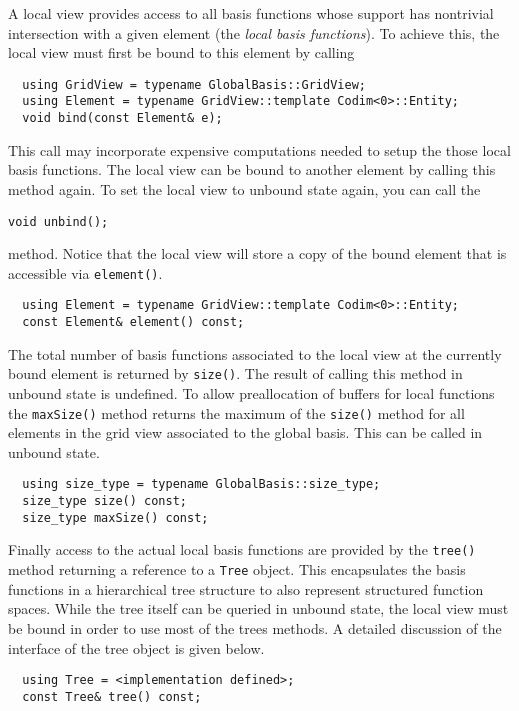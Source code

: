 \documentclass[a4paper,10pt,headings=normal,bibliography=totoc]{scrartcl}
\newcommand{\cpp}[1]{\lstinline[basicstyle=\ttfamily]!#1!}
\begin{document}
A local view provides access to all basis
functions whose support has nontrivial intersection with
a given element (the \emph{local basis functions}).
To achieve this, the local view must
first be bound to this element by calling
\begin{lstlisting}
  using GridView = typename GlobalBasis::GridView;
  using Element = typename GridView::template Codim<0>::Entity;
  void bind(const Element& e);
\end{lstlisting}
This call may incorporate expensive computations needed to
setup the those local basis functions. The local view can be
bound to another element by calling this method again.
To set the local view to unbound state again, you
can call the
\begin{lstlisting}
void unbind();
\end{lstlisting}
method.
Notice that the local view will store a copy of the bound
element that is accessible via \cpp{element()}.
\begin{lstlisting}
  using Element = typename GridView::template Codim<0>::Entity;
  const Element& element() const;
\end{lstlisting}

The total number of basis functions associated to the
local view at the currently bound element is returned
by \cpp{size()}. The result of calling this method in
unbound state is undefined.
To allow preallocation of buffers for local functions
the \cpp{maxSize()} method returns the maximum of the
\cpp{size()} method for all elements in the grid view
associated to the global basis. This can be called in
unbound state.

\begin{lstlisting}
  using size_type = typename GlobalBasis::size_type;
  size_type size() const;
  size_type maxSize() const;
\end{lstlisting}

Finally access to the actual local basis functions are provided
by the \cpp{tree()} method returning a reference to a
\cpp{Tree} object. This encapsulates the basis functions
in a hierarchical tree structure to also represent structured
function spaces.
While the tree  itself can be queried in unbound state,
the local view must be bound in order to use most of the
trees methods.
A detailed discussion of the interface of the tree object is
given below.

\begin{lstlisting}
  using Tree = <implementation defined>;
  const Tree& tree() const;
\end{lstlisting}
\end{document}
